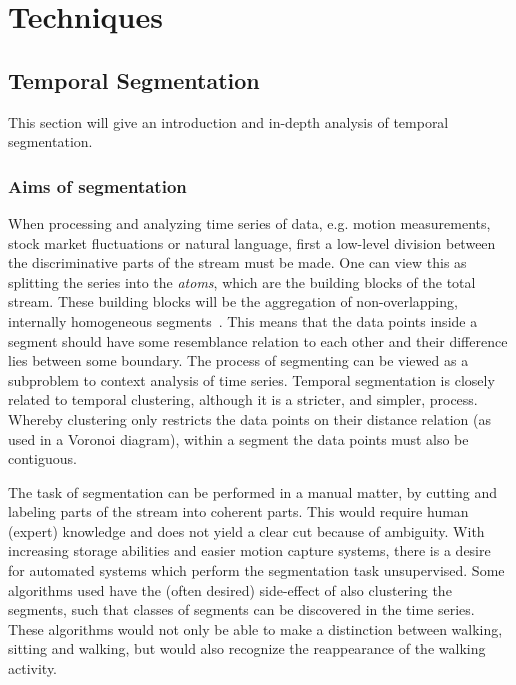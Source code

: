 
\chapter{Techniques} %

\label{Chapter2} %





\section{Temporal Segmentation}
This section will give an introduction and in-depth analysis of temporal segmentation.

\subsection{Aims of segmentation}
When processing and analyzing time series of data, e.g. motion measurements, stock market fluctuations or natural language, first a low-level division between the discriminative parts of the stream must be made.
One can view this as splitting the series into the \emph{atoms}, which are the building blocks of the total stream.
These building blocks will be the aggregation of non-overlapping, internally homogeneous segments~\cite{himberg2001time}.
This means that the data points inside a segment should have some resemblance relation to each other and their difference lies between some boundary.
The process of segmenting can be viewed as a subproblem to context analysis of time series.
Temporal segmentation is closely related to temporal clustering, although it is a stricter, and simpler, process.
Whereby clustering only restricts the data points on their distance relation (as used in a Voronoi diagram), within a segment the data points must also be contiguous.

The task of segmentation can be performed in a manual matter, by cutting and labeling parts of the stream into coherent parts.
This would require human (expert) knowledge and does not yield a clear cut because of ambiguity.
With increasing storage abilities and easier motion capture systems, there is a desire for automated systems which perform the segmentation task unsupervised.
Some algorithms used have the (often desired) side-effect of also clustering the segments, such that classes of segments can be discovered in the time series.
These algorithms would not only be able to make a distinction between walking, sitting and walking, but would also recognize the reappearance of the walking activity.

